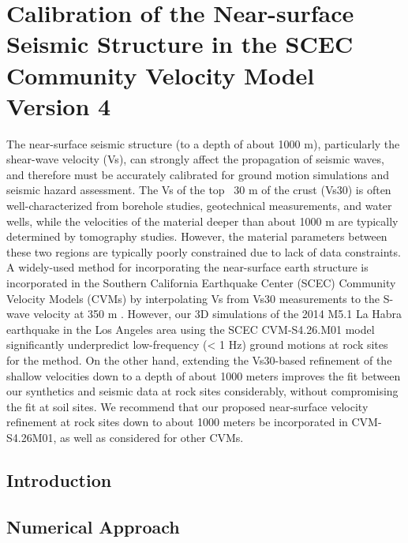 
\linespread{1.7}
\chapter{Calibration of the Near-surface Seismic Structure in the SCEC Community Velocity Model Version 4}
\linespread{2.0}
\label{chap:eks}

\graphicspath{{/Users/zhh076/work/PhD_way/eks/}}

The near-surface seismic structure (to a depth of about 1000 m), particularly the shear-wave velocity (Vs), can strongly affect the propagation of seismic waves, and therefore must be accurately calibrated for ground motion simulations and seismic hazard assessment. The Vs of the top ~30 m of the crust (Vs30) is often well-characterized from borehole studies, geotechnical measurements, and water wells, while the velocities of the material deeper than about 1000 m are typically determined by tomography studies. However, the material parameters between these two regions are typically poorly constrained due to lack of data constraints. A widely-used method for incorporating the near-surface earth structure is incorporated in the Southern California Earthquake Center (SCEC) Community Velocity Models (CVMs) by interpolating Vs from Vs30 measurements to the S-wave velocity at 350 m \citep{elyVs30derivedNearsurfaceSeismic2010}. However, our 3D simulations of the 2014 M5.1 La Habra earthquake in the Los Angeles area using the SCEC CVM-S4.26.M01 model significantly underpredict low-frequency (< 1 Hz) ground motions at rock sites for the \citet{elyVs30derivedNearsurfaceSeismic2010} method. On the other hand, extending the Vs30-based refinement of the shallow velocities down to a depth of about 1000 meters improves the fit between our synthetics and seismic data at rock sites considerably, without compromising the fit at soil sites. We recommend that our proposed near-surface velocity refinement at rock sites down to about 1000 meters be incorporated in CVM-S4.26M01, as well as considered for other CVMs.


\section{Introduction} \label{eks:intro}



\section{Numerical Approach}\label{eks:approach}


